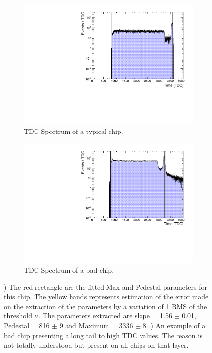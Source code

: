 \begin{figure}[htbp!]
	\begin{subfigure}[t]{0.45\textwidth}
		\centering
		\includegraphics[width=1\linewidth]{chap5/fig_AHCAL_timing/Muons/ExampleTDCSpectra}
		\caption{TDC Spectrum of a typical chip.} \label{fig:TDC_Spectrum}
	\end{subfigure}
	\hfill
	\begin{subfigure}[t]{0.45\textwidth}
		\centering
		\includegraphics[width=1\linewidth]{chap5/fig_AHCAL_timing/Muons/BadTDCSpectra_Layer12}
		\caption{TDC Spectrum of a bad chip.} \label{fig:TDC_Spectrum_bad}
	\end{subfigure}
	\caption{) The red rectangle are the fitted Max and Pedestal parameters for this chip. The yellow bands represents estimation of the error made on the extraction of the parameters by a variation of 1 RMS of the threshold $\mu$. The parameters extracted are slope = 1.56 $\pm$ 0.01, Pedestal = 816 $\pm$ 9 and Maximum = 3336 $\pm$ 8. ) An example of a bad chip presenting a long tail to high TDC values. The reason is not totally understood but present on all chips on that layer.}
\end{figure}

